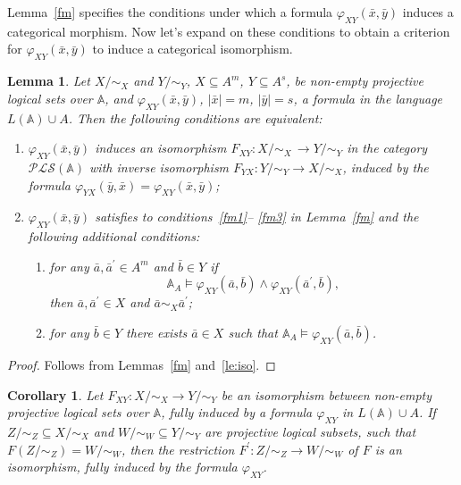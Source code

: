 \documentclass[12pt]{article}
\newtheorem{lemma}{Lemma}
\newtheorem{corollary}{Corollary}
\theoremstyle{definition}
\def\MA{{\mathbb{A}}}
\def\PLS{{\mathcal{PLS}}}
\begin{document}
Lemma~\ref{fm} specifies the conditions under which a formula $\varphi_{XY}(\bar x,\bar y)$ induces a categorical morphism. Now let's expand on these conditions to obtain a criterion for $\varphi_{XY}(\bar x,\bar y)$ to induce a categorical isomorphism.

\begin{lemma}\label{cor4}
Let $X/{\sim_X}$ and $Y/{\sim_Y}$, $X\subseteq A^m$, $Y\subseteq A^s$, be non-empty projective logical sets over $\MA$, and 
$\varphi_{XY}(\bar x,\bar y)$, $|\bar x|=m$, $|\bar y|=s$, a formula in the language $L(\MA)\cup A$. Then the following conditions are equivalent:
\begin{enumerate}[label=\arabic*)]
\item $\varphi_{XY}(\bar x,\bar y)$ induces an isomorphism $F_{XY}\colon X/{\sim_X} \,\to Y/{\sim_Y}$ in the category $\PLS(\MA)$ with inverse isomorphism $F_{YX}\colon Y/{\sim_Y}\to X/{\sim_X}$, induced by the formula $\varphi_{YX}(\bar y,\bar x)=\varphi_{XY}(\bar x,\bar y)$;
\item $\varphi_{XY}(\bar x,\bar y)$ satisfies to conditions~\ref{fm1}-- \ref{fm3} in Lemma~\ref{fm} and the following additional conditions:
\begin{enumerate}[label=(\roman*)]\addtocounter{enumii}{3}
\item for any $\bar a,\bar a^\prime\in A^m$ and $\bar b\in Y$ if
$$
\MA_A\models\varphi_{XY}(\bar a, \bar b)\wedge\varphi_{XY}(\bar a^\prime, \bar b),
$$
then $\bar a,\bar a^\prime\in X$ and $\bar a\sim_X \bar a^\prime$;
\item for any $\bar b\in Y$ there exists $\bar a\in X$ such that $\MA_A\models\varphi_{XY}(\bar a, \bar b)$.
\end{enumerate}
\end{enumerate}
\end{lemma}

\begin{proof}
Follows from Lemmas~\ref{fm} and~\ref{le:iso}.
\end{proof}

\begin{corollary}\label{cor:descent}
    Let $F_{XY}\colon X/{\sim_X}\to Y/{\sim_Y}$ be an isomorphism between non-empty projective logical sets over $\MA$, fully induced by a formula $\varphi_{XY}$ in $L(\MA)\cup A$. If $Z/{\sim_Z}\subseteq X/{\sim_X}$ and $W/{\sim_W}\subseteq Y/{\sim_Y}$ are projective logical subsets, such that $F(Z/{\sim_Z})=W/{\sim_W}$, then the restriction $F^\prime\colon Z/{\sim_Z}\to W/{\sim_W}$ of $F$ is an isomorphism, fully induced by the formula $\varphi_{XY}$.
\end{corollary}
\end{document}
